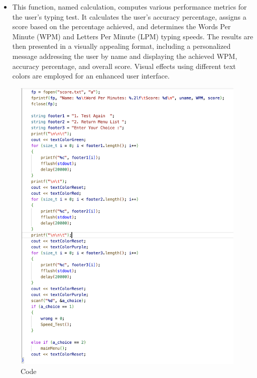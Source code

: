     \begin{itemize}
        \item This function, named calculation, computes various performance metrics for the user's typing test. It calculates the user's accuracy percentage, assigns a score based on the percentage achieved, and determines the Words Per Minute (WPM) and Letters Per Minute (LPM) typing speeds. The results are then presented in a visually appealing format, including a personalized message addressing the user by name and displaying the achieved WPM, accuracy percentage, and overall score. Visual effects using different text colors are employed for an enhanced user interface.
    \end{itemize}
\newpage
\begin{figure}[h]
     \includegraphics[scale=0.20]{CodeScreenShot/calcu-3.png}
    \caption{Code}
    \label{fig:code-screenshots}
\end{figure}

